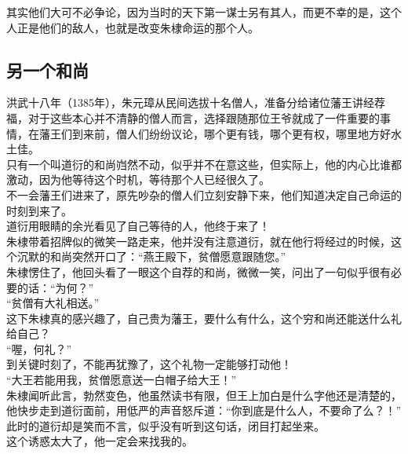 \begin{multicols}{\theparacolNo}
其实他们大可不必争论，因为当时的天下第一谋士另有其人，而更不幸的是，这个人正是他们的敌人，也就是改变朱棣命运的那个人。\\

\subsection{另一个和尚}
洪武十八年（1385年），朱元璋从民间选拔十名僧人，准备分给诸位藩王讲经荐福，对于这些本心并不清静的僧人而言，选择跟随那位王爷就成了一件重要的事情，在藩王们到来前，僧人们纷纷议论，哪个更有钱，哪个更有权，哪里地方好水土佳。\\

只有一个叫道衍的和尚岿然不动，似乎并不在意这些，但实际上，他的内心比谁都激动，因为他等待这个时机，等待那个人已经很久了。\\

不一会藩王们进来了，原先吵杂的僧人们立刻安静下来，他们知道决定自己命运的时刻到来了。\\

道衍用眼睛的余光看见了自己等待的人，他终于来了！\\

朱棣带着招牌似的微笑一路走来，他并没有注意道衍，就在他行将经过的时候，这个沉默的和尚突然开口了：“燕王殿下，贫僧愿意跟随您。”\\

朱棣愣住了，他回头看了一眼这个自荐的和尚，微微一笑，问出了一句似乎很有必要的话：“为何？”\\

“贫僧有大礼相送。”\\

这下朱棣真的感兴趣了，自己贵为藩王，要什么有什么，这个穷和尚还能送什么礼给自己？\\

“喔，何礼？”\\

到关键时刻了，不能再犹豫了，这个礼物一定能够打动他！\\

“大王若能用我，贫僧愿意送一白帽子给大王！”\\

朱棣闻听此言，勃然变色，他虽然读书有限，但王上加白是什么字他还是清楚的，他快步走到道衍面前，用低严的声音怒斥道：“你到底是什么人，不要命了么？！”\\

此时的道衍却是笑而不言，似乎没有听到这句话，闭目打起坐来。\\

这个诱惑太大了，他一定会来找我的。\\


\end{multicols}
